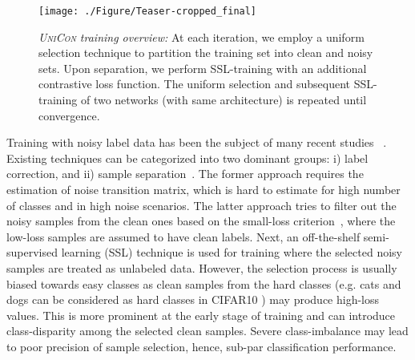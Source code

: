 \documentclass[10pt,twocolumn,letterpaper]{article}
\begin{document}
\begin{figure}[t]
\centering
\texttt{[image: ./Figure/Teaser-cropped\_final]}
\vspace{-2mm}
\caption{\textit{\textsc{UniCon} training overview:} At each iteration, we employ a uniform selection technique to partition the training set into clean and noisy sets. Upon separation, we perform SSL-training with an additional contrastive loss function. The uniform selection and subsequent SSL-training of two networks (with same architecture) is repeated until convergence.}

\label{fig:framework}
\vspace{-2mm}
\end{figure}
\begin{table}[t]
\centering
\small
{}
\vspace{-1mm}
\caption{Classification performance (\%) of the proposed method on CIFAR10 under severe label noise.
}
\label{tab:severe}
\vspace{-4mm}
\end{table}

Training with noisy label data has been the subject of many recent studies ~\cite{han2018co,jiang2020beyond,liu2020peer,qu2021dat,zhang2021learning,sharma2020noiserank}. Existing techniques can be categorized into two dominant groups: i) label correction, \cite{goldberger2016training,patrini2017making} and ii) sample separation~\cite{han2018co,yu2019does,li2020dividemix}. 
The former approach requires the estimation of noise transition matrix, which is hard to estimate for high number of classes and in high noise scenarios. 
The latter approach tries to filter out the noisy samples from the clean ones based on the small-loss criterion~\cite{li2020dividemix}, where the low-loss samples are assumed to have clean labels. Next, an off-the-shelf semi-supervised learning (SSL) technique \cite{berthelot2019mixmatch, sohn2020fixmatch, rizve2021in, tarvainen2017mean} is used for training where the selected noisy samples are treated as unlabeled data.  However, the selection process is usually biased towards easy classes as clean samples from the hard classes (e.g. cats and dogs can be considered as hard classes in CIFAR10 \cite{krizhevsky2009learning}) may produce high-loss values. This is more prominent at the early stage of training and can introduce class-disparity among the selected clean samples. Severe class-imbalance may lead to poor precision of sample selection, hence, sub-par classification performance.  
\end{document}
